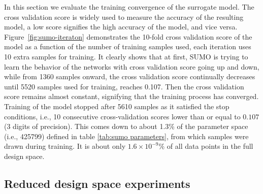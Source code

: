 In this section we evaluate the training convergence of
the surrogate model. The cross validation score is widely used to measure the accuracy of the resulting model, a low score signifies the high accuracy of the model, and vice versa. Figure~\ref{fig:sumo-iteraton} demonstrates the 10-fold cross validation score of the model as a function of the number of training samples used, each iteration uses 10 extra samples for training.  %
It clearly shows that at first, SUMO is trying to learn the behavior of the networks with cross validation score going up and down, while from 1360 samples onward, the cross validation score continually decreases until 5520 samples used for training, reaches 0.107. Then the cross validation score remains almost constant, signifying that the training process has converged.  Training of the model stopped after 5610 samples as it satisfied the stop conditions, i.e., 10 consecutive cross-validation scores lower than or equal to $0.107$ (3 digits of precision). This comes down to about 1.3\% of the parameter space (i.e., 425799) defined in table \ref{tab:sumo parameters}, from which samples were drawn during training. It is about only $1.6 \times 10^{-9}\%$ of all data points in the full design space.






\subsection{Reduced design space experiments}


